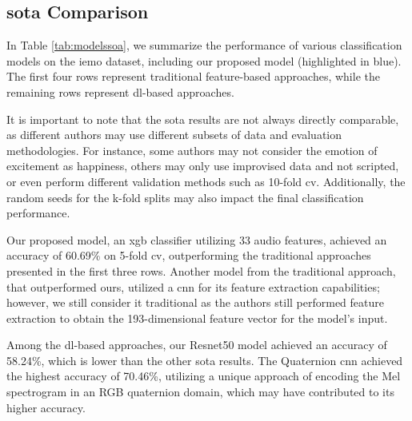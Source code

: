 \subsection{\ac{sota} Comparison}

In Table \ref{tab:modelssoa}, we summarize the performance of various classification models on the \ac{iemo} dataset, including our proposed model (highlighted in blue). The first four rows represent traditional feature-based approaches, while the remaining rows represent \ac{dl}-based approaches.

It is important to note that the \ac{sota} results are not always directly comparable, as different authors may use different subsets of data and evaluation methodologies. For instance, some authors may not consider the emotion of excitement as happiness, others may only use improvised data and not scripted, or even perform different validation methods such as 10-fold \ac{cv}. Additionally, the random seeds for the k-fold splits may also impact the final classification performance.

Our proposed model, an \ac{xgb} classifier utilizing 33 audio features, achieved an accuracy of 60.69\% on 5-fold \ac{cv}, outperforming the traditional approaches presented in the first three rows. Another model from the traditional approach, that outperformed ours, utilized a \ac{cnn} for its feature extraction capabilities; however, we still consider it traditional as the authors still performed feature extraction to obtain the 193-dimensional feature vector for the model's input.

Among the \ac{dl}-based approaches, our Resnet50 model achieved an accuracy of 58.24\%, which is lower than the other \ac{sota} results. The Quaternion \ac{cnn} achieved the highest accuracy of 70.46\%, utilizing a unique approach of encoding the Mel spectrogram in an RGB quaternion domain, which may have contributed to its higher accuracy.

